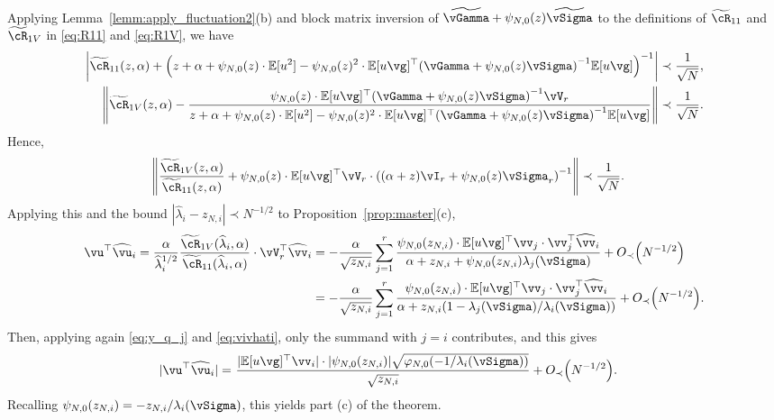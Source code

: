 \begin{proof-of-theorem}
Applying Lemma~\ref{lemm:apply_fluctuation2}(b) and block matrix inversion of
$\widetilde \vGamma+\psi_{N,0}(z)\widetilde \vSigma$ to the definitions of
$\widetilde \cR_{11}$ and $\widetilde \vcR_{1V}$ in \eqref{eq:R11} and
\eqref{eq:R1V}, we have
\begin{align*}
\left|\widetilde
\cR_{11}(z,\alpha)+\left(z+\alpha+\psi_{N,0}(z)\cdot\E[u^2]-\psi_{N,0}(z)^2
\cdot \E[u\vg]^\top\left(\vGamma+\psi_{N,0}(z)\vSigma\right)^{-1}\E[u\vg]\right)^{-1}\right|
&\prec \frac{1}{\sqrt{N}},\\
\left\|\widetilde \vcR_{1V}(z,\alpha)-\frac{\psi_{N,0}(z) \cdot
\E[u\vg]^\top\left(\vGamma+\psi_{N,0}(z)\vSigma
\right)^{-1}\vV_r}{z+\alpha+\psi_{N,0}(z)\cdot\E[u^2]-\psi_{N,0}(z)^2
\cdot \E[u\vg]^\top\left(\vGamma+\psi_{N,0}(z)\vSigma
\right)^{-1}\E[u\vg]}\right\| &\prec \frac{1}{\sqrt{N}}.
\end{align*}
Hence, 
\begin{align*}
	\left\|\frac{ \widetilde \vcR_{1V}(z,\alpha)}{ \widetilde
\cR_{11}(z,\alpha)}+\psi_{N,0}(z) \cdot
\E[u\vg]^\top\vV_r\cdot\left((\alpha+z)\vI_r+\psi_{N,0}(z)\vSigma_r
\right)^{-1}\right\| &\prec \frac{1}{\sqrt{N}}.
\end{align*} 
Applying this and the bound
$|\widehat\lambda_i-z_{N,i}| \prec N^{-1/2}$
to Proposition~\ref{prop:master}(c),
	\begin{align*}
		\vu^\top\widehat{\vu}_i=
\frac{\alpha}{\widehat\lambda_i^{1/2}}
\frac{\widetilde \vcR_{1V}(\widehat\lambda_i,\alpha)}
{\widetilde \cR_{11}(\widehat\lambda_i,\alpha)} \cdot \vV_r^\top \widehat\vv_i
&=-\frac{\alpha}{\sqrt{z_{N,i}}}
\sum_{j=1}^r\frac{\psi_{N,0}(z_{N,i}) \cdot
\E[u\vg]^\top\vv_j\cdot\vv_j^\top\widehat{\vv}_i}{\alpha+z_{N,i}+\psi_{N,0}(z_{N,i})\lambda_j(\vSigma)}+\SD{N^{-1/2}}\\
&=-\frac{\alpha}{\sqrt{z_{N,i}}}
\sum_{j=1}^r\frac{\psi_{N,0}(z_{N,i}) \cdot
\E[u\vg]^\top\vv_j\cdot\vv_j^\top\widehat{\vv}_i}{\alpha+z_{N,i}(1-\lambda_j(\vSigma)/\lambda_i(\vSigma))}+\SD{N^{-1/2}}.
	\end{align*}
Then, applying again \eqref{eq:y_q_j} and \eqref{eq:vivhati}, only the summand
with $j=i$ contributes, and this gives
	\begin{align*}
		|\vu^\top\widehat{\vu}_i|=~&
\frac{|\E[u\vg]^\top\vv_i|\cdot |\psi_{N,0}(z_{N,i})|\sqrt{\varphi_{N,0}
(-1/\lambda_i(\vSigma))}}{\sqrt{z_{N,i}}}+\SD{N^{-1/2}}.
	\end{align*}
Recalling $\psi_{N,0}(z_{N,i})=-z_{N,i}/\lambda_i(\vSigma)$, this yields part
(c) of the theorem.
\end{proof-of-theorem} 




